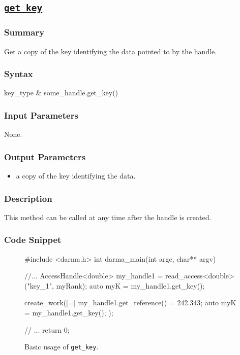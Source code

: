 \clearpage
\subsection{\underline{\texttt{get\_key}}}

\hspace{0.1cm} %
\begin{subs}
\vspace{-1.2cm}

\subsubsection{Summary} 
Get a copy of the key identifying the data pointed to by the handle.

\subsubsection{Syntax} 
\begin{CppCode}
key_type & some_handle.get_key()
\end{CppCode}

\subsubsection{Input Parameters} 
None.

\subsubsection{Output Parameters} 
\begin{itemize}
\item a copy of the key identifying the data.
\end{itemize}

\subsubsection{Description} 
This method can be called at any time after the handle is created.


\subsubsection{Code Snippet} 
\begin{figure}[!h]
\begin{CppCodeNumb}
#include <darma.h>
int darma_main(int argc, char** argv)
{
	//...
  AccessHandle<double> my_handle1 = read_access<double>("key_1", myRank);
  auto myK = my_handle1.get_key();

  create_work([=]{
  	my_handle1.get_reference() = 242.343;
  	auto myK = my_handle1.get_key();
  });

  // ... 
  return 0;
}
\end{CppCodeNumb}
\label{fig:fe_api_initialaccess}
\caption{Basic usage of \texttt{get\_key}.}
\end{figure}

\end{subs}




